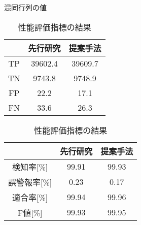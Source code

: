   \begin{table}[h]
    \centering
    \begin{minipage}{0.45\textwidth}  %
        \centering
        \caption{混同行列の値}  %
        \begin{tabular}{|c|c|c|}  %
            \hline  %
            ~ &先行研究 & 提案手法\\  %
            \hline  %
            TP & 39602.4 & 39609.7\\  %
            \hline  %
            TN & 9743.8 & 9748.9\\  %
            \hline  %
            FP & 22.2 & 17.1\\  %
            \hline  %
            FN & 33.6 & 26.3\\  %
            \hline  %
        \end{tabular}
        \label{result2}  %
    \end{minipage} \hspace{1cm}  %
    \begin{minipage}{0.45\textwidth}  %
        \centering
        \caption{性能評価指標の結果}  %
        \begin{tabular}{|c|c|c|}  %
            \hline  %
            ~ &先行研究 & 提案手法\\  %
            \hline  %
            検知率[\%] & 99.91 & 99.93\\  %
            \hline  %
            誤警報率[\%] & 0.23 & 0.17\\  %
            \hline  %
            適合率[\%] & 99.94 & 99.96\\  %
            \hline  %
            F値[\%] & 99.93 & 99.95\\  %
            \hline  %
        \end{tabular}
        \label{result3}  %
    \end{minipage}
  \end{table}
